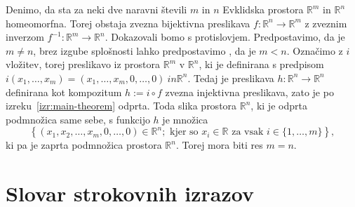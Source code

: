 \documentclass[mat1]{fmfdelo}
\newcommand{\literatura}{literatura}  %
\newcommand{\R}{\mathbb R}
\newcommand{\0}{\underline{0}}
\begin{document}
\begin{dokaz}
Denimo, da sta za neki dve naravni števili $m$ in $n$ Evklidska prostora $\R^m$ in $\R^n$ homeomorfna. Torej obstaja zvezna bijektivna preslikava $f : \R^n \to \R^m$ z zveznim inverzom $f^{-1} : \R^m \to \R^n$. Dokazovali bomo s protislovjem. Predpostavimo, da je $m \neq n$, brez izgube splošnosti lahko predpostavimo , da je $m < n$. Označimo z $i$ vložitev, torej preslikavo iz prostora $\R^m$ v $\R^n$, ki je definirana s predpisom $i(x_1, \dots, x_m) = (x_1, \dots, x_m, 0, \dots, 0) \ in \R^n$. Tedaj je preslikava $h : \R^n \to \R^n$ definirana kot kompozitum $h := i \circ f$ zvezna injektivna preslikava, zato je po izreku~\ref{izr:main-theorem} odprta. Toda slika prostora $\R^n$, ki je odprta podmnožica same sebe, s funkcijo $h$ je množica 
$$\left \{ (x_1, x_2, \dots, x_m, 0, \dots, 0) \in \R^n ; \text{ kjer so } x_i \in \R \text{ za vsak } i \in \{1, \dots, m \}  \right \},$$
 ki pa je zaprta podmnožica prostora $\R^n$. Torej mora biti res $m = n$.
\end{dokaz}

\section*{Slovar strokovnih izrazov}



        
\end{document}
